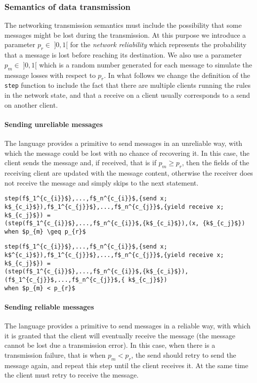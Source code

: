 \subsubsection{Semantics of data transmission} The networking transmission semantics must include the possibility that some messages might be lost during the transmission. At this purpose we introduce a parameter $p_{r} \in \; ]0,1[$ for the \textit{network reliability} which represents the probability that a message is lost before reaching its destination. We also use a parameter $p_{m} \in \; ]0,1[$ which is a random number generated for each message to simulate the message losses with respect to $p_{r}$. In what follows we change the definition of the \texttt{step} function to include the fact that there are multiple clients running the rules in the network state, and that a receive on a client usually corresponds to a send on another client.

\paragraph{Sending unreliable messages} The language provides a primitive to send messages in an unreliable way, with which the message could be lost with no chance of recovering it. In this case, the client sends the message and, if received, that is if $p_{m} \geq p_{r}$, then the fields of the receiving client are updated with the message content, otherwise the receiver does not receive the message and simply skips to the next statement.

\begin{lstlisting}[mathescape = true]
step(f$_1^{c_{i}}$},...,f$_n^{c_{i}}$,{send x; k$_{c_i}$}),f$_1^{c_{j}}$},...,f$_n^{c_{j}}$,{yield receive x; k$_{c_j}$}) =
(step(f$_1^{c_{i}}$},...,f$_n^{c_{i}}$,{k$_{c_i}$}),(x, {k$_{c_j}$})
when $p_{m} \geq p_{r}$
\end{lstlisting}


\begin{lstlisting}[mathescape = true]
step(f$_1^{c_{i}}$},...,f$_n^{c_{i}}$,{send x; k$^{c_i}$}),f$_1^{c_{j}}$},...,f$_n^{c_{j}}$,{yield receive x; k$_{c_j}$}) = 
(step(f$_1^{c_{i}}$},...,f$_n^{c_{i}}$,{k$_{c_i}$}),(f$_1^{c_{j}}$,...,f$_n^{c_{j}}$,{ k$_{c_j}$})
when $p_{m} < p_{r}$
\end{lstlisting}

\paragraph{Sending reliable messages} 
The language provides a primitive to send messages in a reliable way, with which it is granted that the client will eventually receive the message (the message cannot be lost due a transmission error). In this case, when there is a transmission failure, that is when $p_{m} < p_{r}$, the send should retry to send the message again, and repeat this step until the client receives it. At the same time the client must retry to receive the message.


